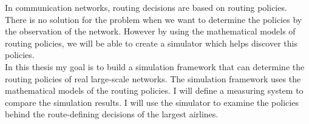 In communication networks, routing decisions are based on routing policies. There is no solution for the problem when we want to determine the policies by the observation of the network. However by using the mathematical models of routing policies, we will be able to create a simulator which helps discover this policies.\\

In this thesis my goal is to build a simulation framework that can determine the routing policies of real large-scale networks. The simulation framework uses the mathematical models of the routing policies. I will define a measuring system to compare the simulation results. I will use the simulator to examine the policies behind the route-defining decisions of the largest airlines.

\vfill